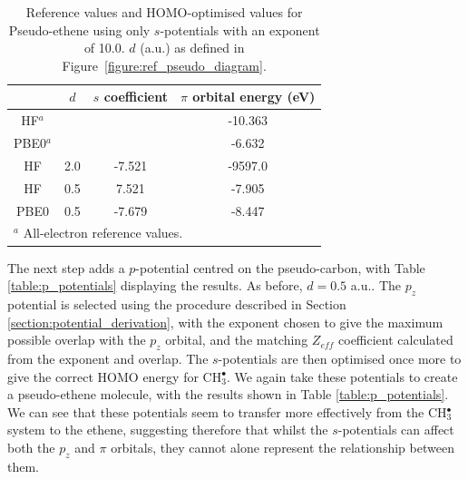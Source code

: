 \documentclass[journal=jctcce,manuscript=article]{achemso}
\begin{document}
\begin{table}[ht]
\caption{Reference values and HOMO-optimised values for Pseudo-ethene using only \(s\)-potentials with an exponent of 10.0.
$d$ (a.u.) as defined in Figure~\ref{figure:ref_pseudo_diagram}.}
\begin{tabular}{c c c c}
\hline
& $d$ & \(s\) coefficient & \( \pi \) orbital energy (eV) \\
\hline
HF$^a$   &     &        & -10.363 \\
PBE0$^a$ &     &        & -6.632 \\
HF       & 2.0 & -7.521 & -9597.0 \\
HF       & 0.5 & 7.521  & -7.905 \\
PBE0     & 0.5 &-7.679  & -8.447 \\
\hline
\multicolumn{4}{l}{$^a$ All-electron reference values.}\\
\end{tabular}
\label{table:ethene_s_pseudo}
\end{table}

The next step adds a \(p\)-potential centred on the pseudo-carbon, with Table \ref{table:p_potentials} displaying the results. As before, \(d = 0.5\) a.u.. The \(p_{z}\) potential is selected using the procedure described in Section \ref{section:potential_derivation}, with the exponent chosen to give the maximum possible overlap with the \(p_{z}\) orbital, and the matching \(Z_{eff}\) coefficient calculated from the exponent and overlap. The \(s\)-potentials are then optimised once more to give the correct HOMO energy for CH\(^{\bullet}_{3}\). We again take these potentials to create a pseudo-ethene molecule, with the results shown in Table \ref{table:p_potentials}. We can see that these potentials seem to transfer more effectively from the CH\(^{\bullet}_{3}\) system to the ethene, suggesting therefore that whilst the \(s\)-potentials can affect both the \(p_{z}\) and \(\pi\) orbitals, they cannot alone represent the relationship between them.
\end{document}
